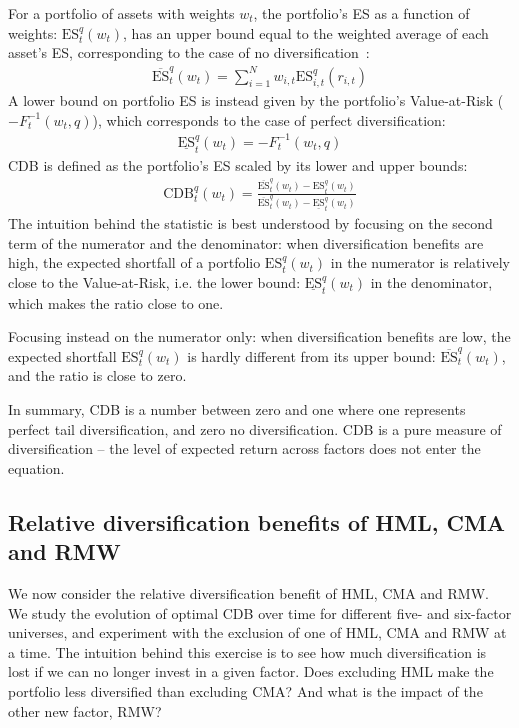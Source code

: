 For a portfolio of assets with weights $w_t$, the portfolio's ES as a function of weights: $\text{ES}_t^q(w_t)$, has an upper bound equal to the weighted average of each asset's ES, corresponding to the case of no diversification~\autocite{Artzner1999}:
\begin{align}
  \overline{\text{ES}}_t^q(w_t) = \sum_{i=1}^N w_{i,t} \text{ES}_{i,t}^q(r_{i,t})
\end{align}
A lower bound on portfolio ES is instead given by the portfolio's Value-at-Risk ($-F_{t}^{-1}(w_t, q)$), which corresponds to the case of perfect diversification:
\begin{align}
  \underline{\text{ES}}_t^q(w_t) = -F_{t}^{-1}(w_t, q)
\end{align}
CDB is defined as the portfolio's ES scaled by its lower and upper bounds:
\begin{align}
  \text{CDB}_t^q(w_t) = \frac{\overline{\text{ES}}_t^q(w_t) - \text{ES}_t^q(w_t)}{\overline{\text{ES}}_t^q(w_t) - \underline{\text{ES}}_t^q(w_t)}
\end{align}
The intuition behind the statistic is best understood by focusing on the second term of the numerator and the denominator: when diversification benefits are high, the expected shortfall of a portfolio $\text{ES}_t^q(w_t)$ in the numerator is relatively close to the Value-at-Risk, i.e. the lower bound: $\underline{\text{ES}}_t^q(w_t)$ in the denominator, which makes the ratio close to one. 

Focusing instead on the numerator only: when diversification benefits are low, the expected shortfall $\text{ES}_t^q(w_t)$ is hardly different from its upper bound: $\overline{\text{ES}}_t^q(w_t)$, and the ratio is close to zero.

In summary, CDB is a number between zero and one where one represents perfect tail diversification, and zero no diversification. CDB is a pure measure of diversification -- the level of expected return across factors does not enter the equation.

\subsection{Relative diversification benefits of HML, CMA and RMW}

We now consider the relative diversification benefit of HML, CMA and RMW. We study the evolution of optimal CDB over time for different five- and six-factor universes, and experiment with the exclusion of one of HML, CMA and RMW at a time. The intuition behind this exercise is to see how much diversification is lost if we can no longer invest in a given factor. Does excluding HML make the portfolio less diversified than excluding CMA? And what is the impact of the other new factor, RMW?

